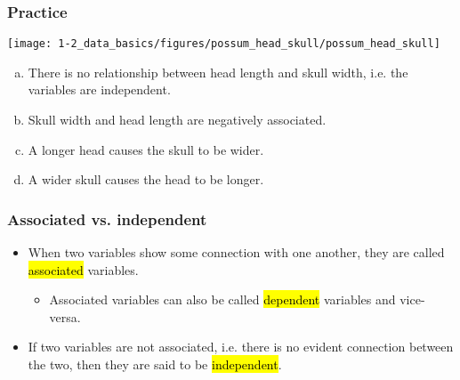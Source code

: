 \begin{frame}
\frametitle{Practice}

{
}
{
\texttt{[image: 1-2\_data\_basics/figures/possum\_head\_skull/possum\_head\_skull]}
}

\begin{enumerate}[(a)]
\item There is no relationship between head length and skull width, i.e. the variables are independent.
\item Skull width and head length are negatively associated.
\item A longer head causes the skull to be wider.
\item A wider skull causes the head to be longer.
\end{enumerate}

\end{frame}


\begin{frame}
\frametitle{Associated vs. independent}

\begin{itemize}

\item When two variables show some connection with one another, they are called \hl{associated} variables.
\begin{itemize}
\item Associated variables can also be called \hl{dependent} variables and vice-versa.
\end{itemize}

\item If two variables are not associated, i.e. there is no evident connection between the two, then they are said to be \hl{independent}.

\end{itemize}

\end{frame}


